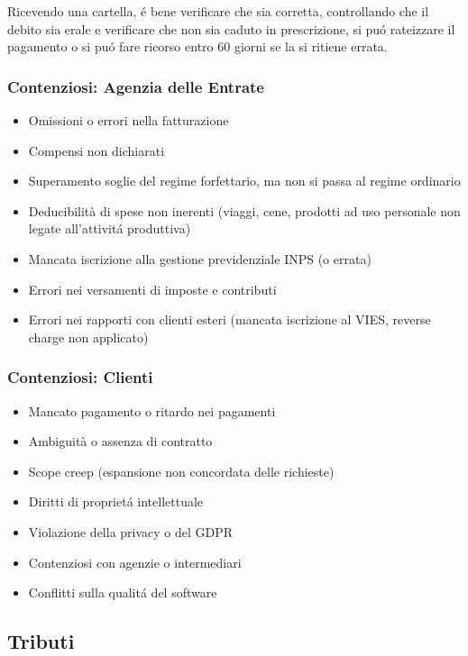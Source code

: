\documentclass{article}
\begin{document}
Ricevendo una cartella, \'e bene verificare che sia corretta, controllando che il debito sia erale e verificare che non sia caduto in prescrizione, si pu\'o rateizzare il pagamento o si pu\'o fare ricorso entro 60 giorni se la si ritiene errata. 

\subsubsection{Contenziosi: Agenzia delle Entrate}
\begin{itemize}
    \item Omissioni o errori nella fatturazione
    \item Compensi non dichiarati
    \item Superamento soglie del regime forfettario, ma non si passa al regime ordinario
    \item Deducibilità di spese non inerenti (viaggi, cene, prodotti ad uso personale non legate all'attivit\'a produttiva)
    \item Mancata iscrizione alla gestione previdenziale INPS (o errata)
    \item Errori nei versamenti di imposte e contributi
    \item Errori nei rapporti con clienti esteri (mancata iscrizione al VIES, reverse charge non applicato)
\end{itemize}

\subsubsection{Contenziosi: Clienti}
\begin{itemize}
    \item Mancato pagamento o ritardo nei pagamenti
    \item Ambiguità o assenza di contratto
    \item Scope creep (espansione non concordata delle richieste)
    \item Diritti di propriet\'a intellettuale
    \item Violazione della privacy o del GDPR
    \item Contenziosi con agenzie o intermediari
    \item Conflitti sulla qualit\'a del software
\end{itemize}

\subsection{Tributi}
\end{document}
